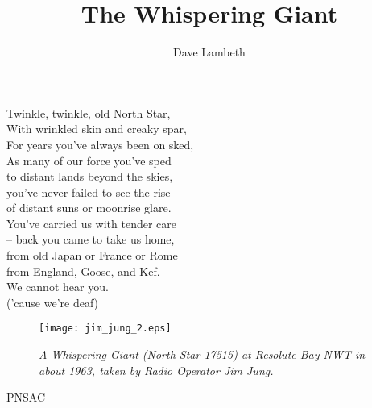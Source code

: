 %


\title{The Whispering Giant}
\author{Dave Lambeth}

\maketitle

\begin{centering}
Twinkle, twinkle, old North Star,\\
With wrinkled skin and creaky
spar,\\
For years you've always been on
sked,\\
As many of our force you've sped\\
to distant lands beyond the skies,\\
you've never failed to see the rise\\
of distant suns or moonrise glare.\\
You've carried us with tender care\\
-- back you came to take us home,\\
from old Japan or France or Rome\\
from England, Goose, and Kef.\\
We cannot hear you.\\
('cause we're deaf)\\
\end{centering}

\begin{figure}[htbp]
   \vspace{2em}
   \centering
   \texttt{[image: jim\_jung\_2.eps]}
   \caption*{\small \em A Whispering Giant (North Star 17515) at
     Resolute Bay NWT in about 1963, taken by Radio Operator Jim Jung.}
   \label{fig:jim_jung}
\end{figure}

\begin{footnotesize}
    \raggedleft PNSAC\\
\end{footnotesize}



